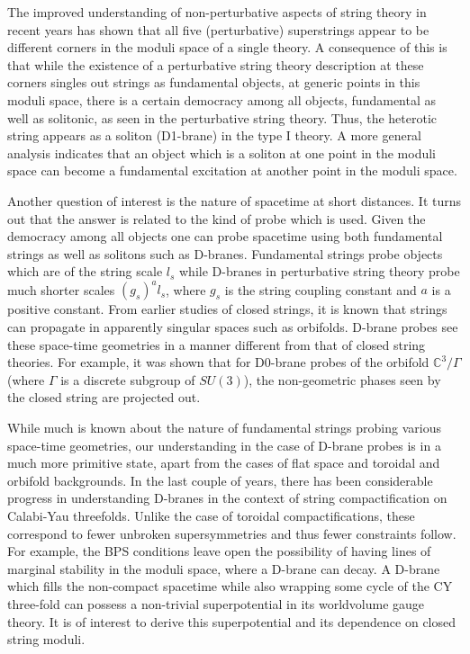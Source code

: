 \documentclass[a4paper,12pt]{article}
\def\Bbb{\mathbb}
\def\BC{\mbox{$\Bbb C$}} \def\BP{\mbox{$\Bbb P$}}
\begin{document}
The improved understanding of non-perturbative aspects of string theory in
recent years has shown that all five (perturbative) superstrings appear to
be different corners in the moduli space of a single theory\cite{schwarz}.
A consequence of this is that while the existence of a perturbative string
theory description at these corners singles out strings as fundamental
objects, at generic points in this moduli space, there is a certain
democracy among all objects, fundamental as well as solitonic, as seen in
the perturbative string theory. Thus, the heterotic string appears as a
soliton (D1-brane) in the type I theory. A more general analysis indicates
that an object which is a soliton at one point in the moduli space can
become a fundamental excitation at another point in the moduli
space\cite{hull}. 

Another question of interest is the nature of spacetime at short
distances. It turns out that the answer is related to the kind of probe
which is used. Given the democracy among all objects one can probe
spacetime using both fundamental strings as well as solitons such as
D-branes. Fundamental strings probe objects which are of the string scale
$l_s$ while D-branes in perturbative string theory probe much shorter
scales $(g_s)^a l_s$, where $g_s$ is the string coupling constant and $a$
is a positive constant\cite{scales}. From earlier studies of closed
strings, it is known that strings can propagate in apparently singular
spaces such as orbifolds. D-brane probes see these space-time geometries in
a manner different from that of closed string theories. For example, it
was shown that for D0-brane probes of the orbifold $\BC^3/\Gamma$ (where
$\Gamma$ is a discrete subgroup of $SU(3)$), the non-geometric phases seen
by the closed string are projected out\cite{dgm}. 

While much is known about the nature of fundamental strings probing
various space-time geometries, our understanding in the case of D-brane
probes is in a much more primitive state, apart from the cases of flat
space and toroidal and orbifold backgrounds.  In the last couple of years,
there has been considerable progress in understanding
D-branes in the context of string compactification on Calabi-Yau
threefolds\cite{ooy,RS,quintic,doug1,stt,boundarylg,dgepner,dfr,
ketal,HV,HIV,kklm2,doug-diac,others}. 
Unlike the case of toroidal compactifications, these correspond to fewer
unbroken supersymmetries and thus fewer constraints follow. For example,
the BPS conditions leave open the possibility of having lines of marginal
stability in the moduli space, where a D-brane can decay.  A D-brane which
fills the non-compact spacetime while also wrapping some cycle of the CY
three-fold can possess a non-trivial superpotential in its worldvolume
gauge theory.  It is of interest to derive this superpotential and its
dependence on closed string moduli. 
\end{document}
